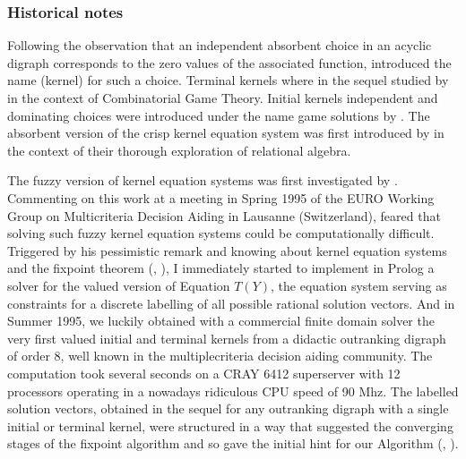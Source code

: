 \documentclass[a4paper,12pt,english]{sphinxhowto}
\begin{document}
\subsubsection{Historical notes}
\label{\detokenize{pearls:historical-notes}}
\sphinxAtStartPar
Following the observation that an independent absorbent choice in an acyclic digraph corresponds to the zero values of the associated  function,   introduced the name  (kernel) for such a choice. Terminal kernels where in the sequel studied by   in the context of Combinatorial Game Theory. Initial kernels \textendash{}independent and dominating choices\textendash{} were introduced under the name game solutions by  . The absorbent version of the crisp kernel equation system  was first introduced by   in the context of their thorough exploration of relational algebra.

\sphinxAtStartPar
The fuzzy version of kernel equation systems was first investigated by  . Commenting on this work at a meeting in Spring 1995 of the EURO Working Group on Multicriteria Decision Aiding in Lausanne (Switzerland),  feared that solving such fuzzy kernel equation systems could be computationally difficult. Triggered by his pessimistic remark and knowing about kernel equation systems and the  fixpoint theorem (, ), I immediately started to implement in Prolog a solver for the valued version of Equation \(T(Y)\), the equation system serving as constraints for a discrete labelling of all possible rational solution vectors. And in Summer 1995, we luckily obtained with a commercial finite domain solver the very first valued initial and terminal kernels from a didactic outranking digraph of order 8, well known in the multiple\sphinxhyphen{}criteria decision aiding community. The computation took several seconds on a CRAY 6412 superserver with 12 processors operating in a nowadays ridiculous CPU speed of 90 Mhz. The labelled solution vectors, obtained in the sequel for any outranking digraph with a single initial or terminal kernel, were structured in a way that suggested the converging stages of the  fixpoint algorithm and so gave the initial hint for our Algorithm (, ).
\end{document}

